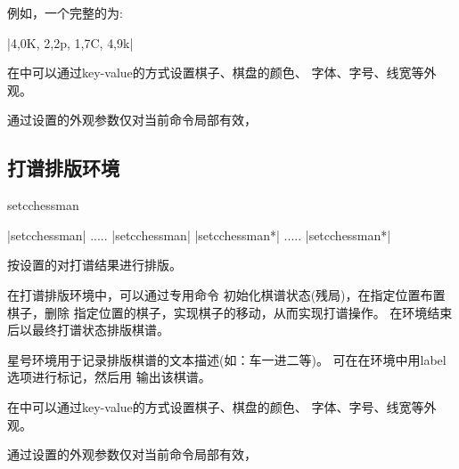 \documentclass[full]{l3doc}
\begin{document}
\begin{documentation}
  例如，一个完整的为:

  |{{4,0}{K}}, {{2,2}{p}}, {{1,7}{C}}, {{4,9}{k}}|

  在中可以通过key-value的方式设置棋子、棋盘的颜色、
  字体、字号、线宽等外观。

  通过设置的外观参数仅对当前命令局部有效，

\begin{SideBySideExample}[frame=single,numbers=left,
                xrightmargin=.50\linewidth,gobble=2]
  \centering
\end{SideBySideExample}

\subsection{打谱排版环境}

\begin{function}{setcchessman}
  \begin{syntax}
    |{setcchessman}|
    .....
    |{setcchessman}|
    |{setcchessman*}|
    .....
    |{setcchessman*}|
  \end{syntax}
\end{function}

  按设置的对打谱结果进行排版。

  在打谱排版环境中，可以通过专用命令%
  初始化棋谱状态(残局)，在指定位置布置棋子，删除
  指定位置的棋子，实现棋子的移动，从而实现打谱操作。
  在环境结束后以最终打谱状态排版棋谱。

  星号环境用于记录排版棋谱的文本描述(如：车一进二等)。
  可在在环境中用label选项进行标记，然后用%
  输出该棋谱。

  在中可以通过key-value的方式设置棋子、棋盘的颜色、
  字体、字号、线宽等外观。

  通过设置的外观参数仅对当前命令局部有效，

\begin{SideBySideExample}[frame=single,numbers=left,
                xrightmargin=.48\linewidth,gobble=2]
  \centering
  \begin{setcchessman}
     
     
     
     
  \end{setcchessman}
\end{SideBySideExample}


\end{documentation}
\end{document}
